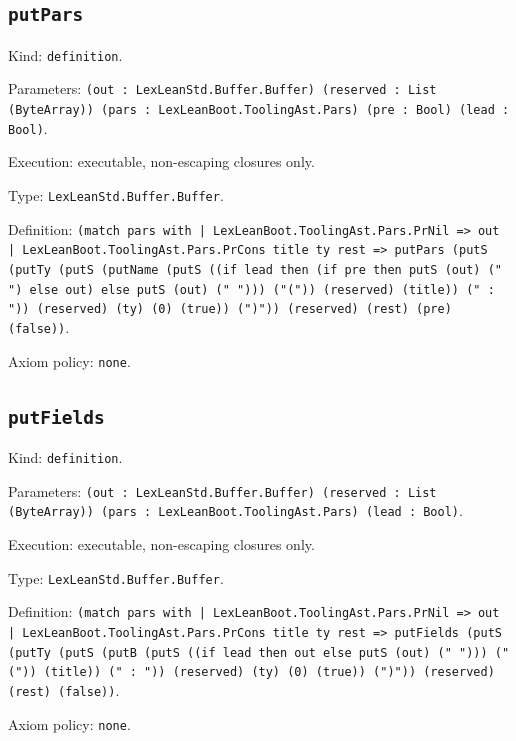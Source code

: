 \documentclass[11pt]{article}
\begin{document}
\subsection*{\texttt{putPars}}
\noindent Kind: \texttt{definition}.\par
\noindent Parameters: \texttt{(out : LexLeanStd.Buffer.Buffer) (reserved : List (ByteArray)) (pars : LexLeanBoot.ToolingAst.Pars) (pre : Bool) (lead : Bool)}.\par
\noindent Execution: executable, non-escaping closures only.\par
\noindent Type: \texttt{LexLeanStd.Buffer.Buffer}.\par
\noindent Definition: \texttt{(match pars with | LexLeanBoot.ToolingAst.Pars.PrNil => out | LexLeanBoot.ToolingAst.Pars.PrCons title ty rest => putPars (putS (putTy (putS (putName (putS ((if lead then (if pre then putS (out) (" ") else out) else putS (out) (" "))) ("(")) (reserved) (title)) (" : ")) (reserved) (ty) (0) (true)) (")")) (reserved) (rest) (pre) (false))}.\par
\noindent Axiom policy: \texttt{none}.\par
\subsection*{\texttt{putFields}}
\noindent Kind: \texttt{definition}.\par
\noindent Parameters: \texttt{(out : LexLeanStd.Buffer.Buffer) (reserved : List (ByteArray)) (pars : LexLeanBoot.ToolingAst.Pars) (lead : Bool)}.\par
\noindent Execution: executable, non-escaping closures only.\par
\noindent Type: \texttt{LexLeanStd.Buffer.Buffer}.\par
\noindent Definition: \texttt{(match pars with | LexLeanBoot.ToolingAst.Pars.PrNil => out | LexLeanBoot.ToolingAst.Pars.PrCons title ty rest => putFields (putS (putTy (putS (putB (putS ((if lead then out else putS (out) (" "))) ("(")) (title)) (" : ")) (reserved) (ty) (0) (true)) (")")) (reserved) (rest) (false))}.\par
\noindent Axiom policy: \texttt{none}.\par
\end{document}
